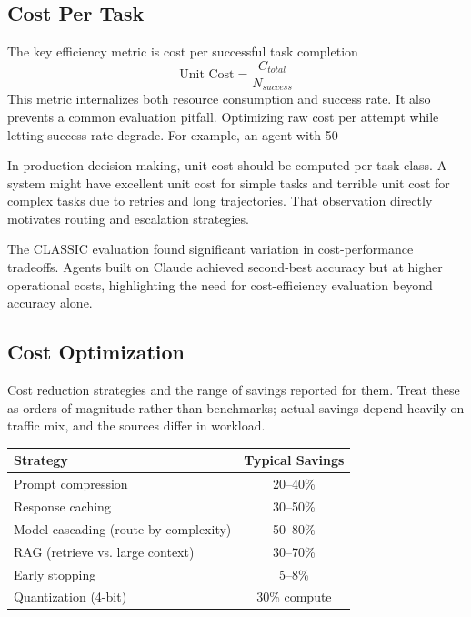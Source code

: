 \subsection{Cost Per Task}

The key efficiency metric is cost per successful task completion
\[
\text{Unit Cost} = \frac{C_{total}}{N_{success}}
\]
This metric internalizes both resource consumption and success rate. It also prevents a common evaluation pitfall. Optimizing raw cost per attempt while letting success rate degrade. For example, an agent with 50%

In production decision-making, unit cost should be computed per task class. A system might have excellent unit cost for simple tasks and terrible unit cost for complex tasks due to retries and long trajectories. That observation directly motivates routing and escalation strategies.

The CLASSIC evaluation \cite{classic2025} found significant variation in cost-performance tradeoffs. Agents built on Claude achieved second-best accuracy but at higher operational costs, highlighting the need for cost-efficiency evaluation beyond accuracy alone.

\subsection{Cost Optimization}

Cost reduction strategies and the range of savings reported for them. Treat these as orders of magnitude rather than benchmarks; actual savings depend heavily on traffic mix, and the sources differ in workload.

\begin{center}
\begin{tabular}{lc}
\toprule
Strategy & Typical Savings \\
\midrule
Prompt compression & 20–40\% \\
Response caching & 30–50\% \\
Model cascading (route by complexity) & 50–80\% \\
RAG (retrieve vs. large context) & 30–70\% \\
Early stopping & 5–8\% \\
Quantization (4-bit) & 30\% compute \\
\bottomrule
\end{tabular}
\end{center}

